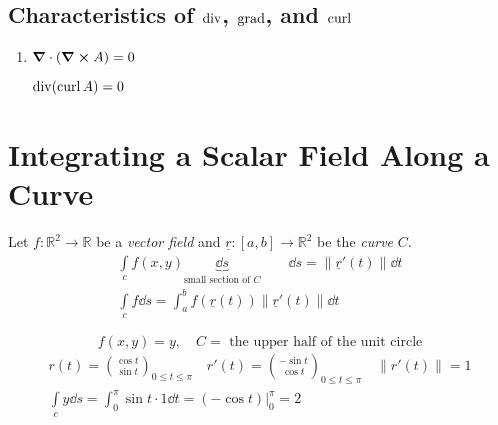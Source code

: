 \documentclass[00_complete]{subfiles}
\begin{document}
\subsection{Characteristics of \texorpdfstring{$\operatorname{div}$, $\operatorname{grad}$, and
$\operatorname{curl}$}{div, grad, and curl}}
\begin{enumerate}
    \item $\grad \cdot (\curl A) = 0$

        $\operatorname{div}(\operatorname{curl} A)=0$
\end{enumerate}
\section{Integrating a Scalar Field Along a Curve}
Let $f: \mathbb{R}^2 \to \mathbb{R}$ be a \emph{vector field} and $\underline
r: [a,b] \to \mathbb{R}^2$ be the \emph{curve} $C$.
\begin{gather*}
\int\limits_cf(x,y)\underbrace{\dd{s}}_{\text{small section of } C} \qquad
\dd{s} = \|\underline{r}'(t)\|\dd{t} \\
\int\limits_cf\dd{s}=\int_a^b f(\underline{r}(t))\|\underline{r}'(t)\|\dd{t}
\end{gather*}
\begin{example}
    $$f(x,y)=y, \quad C= \text{ the upper half of the unit circle}$$
    \begin{gather*}
        r(t)=\binom{\cos t}{\sin t}_{0 \leq t \leq \pi} \quad
        r'(t) = \binom{-\sin t}{\cos t}_{0 \leq t \leq \pi} \quad \|r'(t)\|=1 \\
        \int\limits_cy\dd{s} = \int_0^\pi \sin t \cdot 1 \dd{t} = (-\cos
        t)\Bigr|_0^\pi = 2
    \end{gather*}
\end{example}
\end{document}
